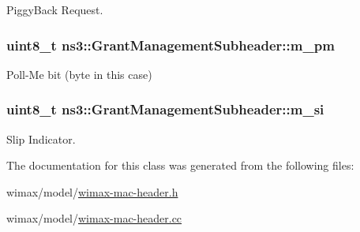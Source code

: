 Piggy\+Back Request. 

\subsubsection[{\texorpdfstring{m\+\_\+pm}{m_pm}}]{\setlength{\rightskip}{0pt plus 5cm}uint8\+\_\+t ns3\+::\+Grant\+Management\+Subheader\+::m\+\_\+pm\hspace{0.3cm}{\ttfamily [private]}}\hypertarget{classns3_1_1GrantManagementSubheader_aea7a8b4446e3692b0f0add9cbab0cb61}{}\label{classns3_1_1GrantManagementSubheader_aea7a8b4446e3692b0f0add9cbab0cb61}


Poll-\/\+Me bit (byte in this case) 

\subsubsection[{\texorpdfstring{m\+\_\+si}{m_si}}]{\setlength{\rightskip}{0pt plus 5cm}uint8\+\_\+t ns3\+::\+Grant\+Management\+Subheader\+::m\+\_\+si\hspace{0.3cm}{\ttfamily [private]}}\hypertarget{classns3_1_1GrantManagementSubheader_aabae341a66704c1f5663659c7ce110f5}{}\label{classns3_1_1GrantManagementSubheader_aabae341a66704c1f5663659c7ce110f5}


Slip Indicator. 



The documentation for this class was generated from the following files\+:\begin{DoxyCompactItemize}
\item 
wimax/model/\hyperlink{wimax-mac-header_8h}{wimax-\/mac-\/header.\+h}\item 
wimax/model/\hyperlink{wimax-mac-header_8cc}{wimax-\/mac-\/header.\+cc}\end{DoxyCompactItemize}
